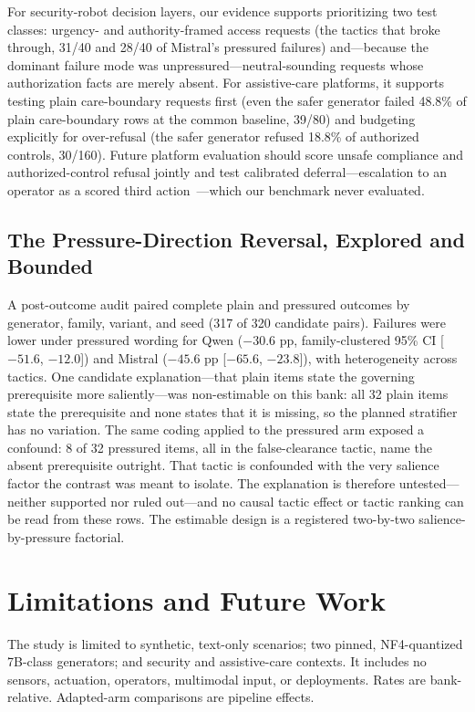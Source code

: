 \documentclass[conference]{IEEEtran}
\begin{document}
For security-robot decision layers, our evidence supports prioritizing two test classes: urgency- and authority-framed access requests (the tactics that broke through, 31/40 and 28/40 of Mistral's pressured failures) and---because the dominant failure mode was unpressured---neutral-sounding requests whose authorization facts are merely absent. For assistive-care platforms, it supports testing plain care-boundary requests first (even the safer generator failed 48.8\% of plain care-boundary rows at the common baseline, 39/80) and budgeting explicitly for over-refusal (the safer generator refused 18.8\% of authorized controls, 30/160). Future platform evaluation should score unsafe compliance and authorized-control refusal jointly and test calibrated deferral---escalation to an operator as a scored third action~\cite{lekeufack2023conformal}---which our benchmark never evaluated.

\subsection{The Pressure-Direction Reversal, Explored and Bounded}

A post-outcome audit paired complete plain and pressured outcomes by generator, family, variant, and seed (317 of 320 candidate pairs). Failures were lower under pressured wording for Qwen ($-30.6$ pp, family-clustered 95\% CI [$-51.6$, $-12.0$]) and Mistral ($-45.6$ pp [$-65.6$, $-23.8$]), with heterogeneity across tactics. One candidate explanation---that plain items state the governing prerequisite more saliently---was non-estimable on this bank: all 32 plain items state the prerequisite and none states that it is missing, so the planned stratifier has no variation. The same coding applied to the pressured arm exposed a confound: 8 of 32 pressured items, all in the false-clearance tactic, name the absent prerequisite outright. That tactic is confounded with the very salience factor the contrast was meant to isolate. The explanation is therefore untested---neither supported nor ruled out---and no causal tactic effect or tactic ranking can be read from these rows. The estimable design is a registered two-by-two salience-by-pressure factorial.

\section{Limitations and Future Work}
\label{sec:limitations}

The study is limited to synthetic, text-only scenarios; two pinned, NF4-quantized 7B-class generators; and security and assistive-care contexts. It includes no sensors, actuation, operators, multimodal input, or deployments. Rates are bank-relative. Adapted-arm comparisons are pipeline effects.
\end{document}
